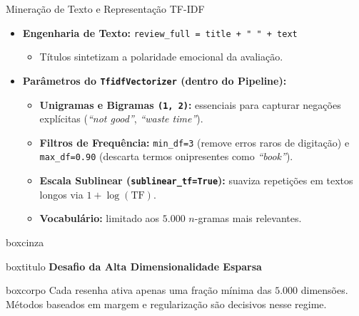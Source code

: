 \documentclass[aspectratio=43]{beamer}
\begin{document}
\begin{frame}[t]{Mineração de Texto e Representação TF-IDF}

\vspace{0.1cm}

\begin{itemize}
    \item \textbf{Engenharia de Texto:} \texttt{review\_full = title + " " + text}
    \begin{itemize}
        \item Títulos sintetizam a polaridade emocional da avaliação.
    \end{itemize}

    \vspace{0.2cm}

    \item \textbf{Parâmetros do \texttt{TfidfVectorizer} (dentro do Pipeline):}
    \begin{itemize}
        \item \textbf{Unigramas e Bigramas \texttt{(1, 2)}:} essenciais para capturar negações explícitas (\textit{``not good''}, \textit{``waste time''}).
        \item \textbf{Filtros de Frequência:} \texttt{min\_df=3} (remove erros raros de digitação) e \texttt{max\_df=0.90} (descarta termos onipresentes como \textit{``book''}).
        \item \textbf{Escala Sublinear (\texttt{sublinear\_tf=True}):} suaviza repetições em textos longos via $1 + \log(\text{TF})$.
        \item \textbf{Vocabulário:} limitado aos $5.000$ $n$-gramas mais relevantes.
    \end{itemize}
\end{itemize}

\vspace{0.2cm}

\begin{center}
\begin{beamercolorbox}[wd=0.96\textwidth, sep=0pt]{boxcinza}
  \begin{beamercolorbox}[wd=0.96\textwidth, ht=0.45cm, dp=0.08cm, leftskip=0.2cm]{boxtitulo}
    {\color{uelgreen}\scriptsize\textbf{Desafio da Alta Dimensionalidade Esparsa}}
  \end{beamercolorbox}
  \begin{beamercolorbox}[wd=0.96\textwidth, sep=0.2cm]{boxcorpo}
    \scriptsize Cada resenha ativa apenas uma fração mínima das $5.000$ dimensões. Métodos baseados em margem e regularização são decisivos nesse regime.
  \end{beamercolorbox}
\end{beamercolorbox}
\end{center}

\end{frame}
\end{document}
